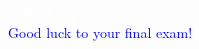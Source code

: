 \documentclass{beamer}
\begin{document}
    \begin{frame} 
        \begin{center}
            \textcolor{white}{Golden egg} \\ 
            \Large\textcolor{blue}{Good luck to your final exam!} \\
        \end{center}
    \end{frame}
\end{document}
